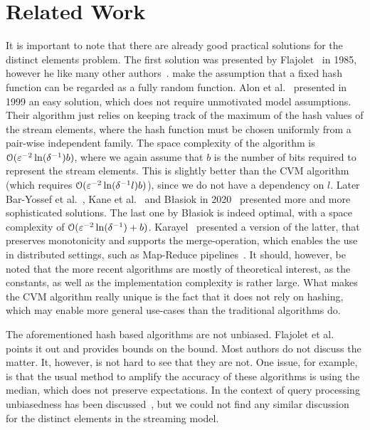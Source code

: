 \section{Related Work}\label{sec:related_work}
It is important to note that there are already good practical solutions for the distinct elements problem.
The first solution was presented by Flajolet~\cite{flajolet1985} in 1985, however he like many other authors~\cite{flajolet2007,heule2013,pettie2021}. make the assumption that a fixed hash function can be regarded as a fully random function.
Alon et al.~\cite[Section 2.3]{alon1999} presented in 1999 an easy solution, which does not require unmotivated model assumptions.
Their algorithm just relies on keeping track of the maximum of the hash values of the stream elements, where the hash function must be chosen uniformly from a pair-wise independent family.
The space complexity of the algorithm is $\operatorname{\mathcal O}(\varepsilon^{-2} \ln (\delta^{-1}) b)$, where we again assume that $b$ is the number of bits required to represent the stream elements.
This is slightly better than the CVM algorithm (which requires $\operatorname{\mathcal O}(\varepsilon^{-2} \ln (\delta^{-1}l) b)$), since we do not have a dependency on $l$.
Later Bar-Yossef et al.~\cite{baryossef2002}, Kane et al.~\cite{kane2010} and B\l{}asiok in 2020~\cite{blasiok2020} presented more and more sophisticated solutions.
The last one by B\l{}asiok is indeed optimal, with a space complexity of $\operatorname{\mathcal O}(\varepsilon^{-2} \ln (\delta^{-1}) + b)$.
Karayel~\cite{karayel2023} presented a version of the latter, that preserves monotonicity and supports the merge-operation, which enables the use in distributed settings, such as Map-Reduce pipelines~\cite{dean2010}.
It should, however, be noted that the more recent algorithms are mostly of theoretical interest, as the constants, as well as the implementation complexity is rather large.
What makes the CVM algorithm really unique is the fact that it does not rely on hashing, which may enable more general use-cases than the traditional algorithms do.

The aforementioned hash based algorithms are not unbiased.
Flajolet et al.~\cite{flajolet1985} points it out and provides bounds on the bound.
Most authors do not discuss the matter.
It, however, is not hard to see that they are not.
One issue, for example, is that the usual method to amplify the accuracy of these algorithms is using the median, which does not preserve expectations.
In the context of query processing unbiasedness has been discussed~\cite[Section 2.1]{haas1995}, but we could not find any similar discussion for the distinct elements in the streaming model.

